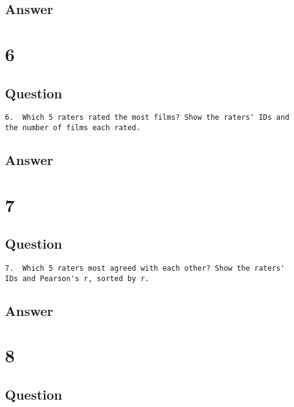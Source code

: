 \documentclass[letterpaper,11pt]{article}
\begin{document}
\newpage
\subsection*{Answer}

\newpage

\section*{6}

\subsection*{Question}

\begin{verbatim}
6.  Which 5 raters rated the most films? Show the raters' IDs and
the number of films each rated.
\end{verbatim}

\newpage
\subsection*{Answer}

\newpage

\section*{7}

\subsection*{Question}

\begin{verbatim}
7.  Which 5 raters most agreed with each other? Show the raters'
IDs and Pearson's r, sorted by r.
\end{verbatim}

\newpage
\subsection*{Answer}

\newpage

\section*{8}

\subsection*{Question}
\end{document}
